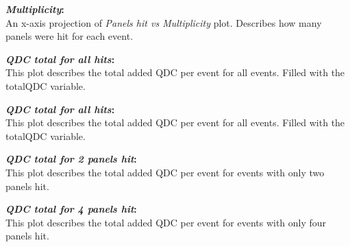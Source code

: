 \documentclass[a4paper,12pt]{article}
\begin{document}
\textbf{\emph{Multiplicity}:} \\
An x-axis projection of \emph{Panels hit vs Multiplicity} plot. Describes how many panels were hit for each event.

\textbf{\emph{QDC total for all hits}:} \\
This plot describes the total added QDC per event for all events. Filled with the totalQDC variable.

\pagebreak
\begin{figure}[h]
\centering
{}%
\end{figure}

\textbf{\emph{QDC total for all hits}:} \\
This plot describes the total added QDC per event for all events. Filled with the totalQDC variable.

\textbf{\emph{QDC total for 2 panels hit}:} \\
This plot describes the total added QDC per event for events with only two panels hit.

\textbf{\emph{QDC total for 4 panels hit}:} \\
This plot describes the total added QDC per event for events with only four panels hit.

\pagebreak
\begin{figure}[h]
\centering
{}%
\end{figure}
\end{document}
